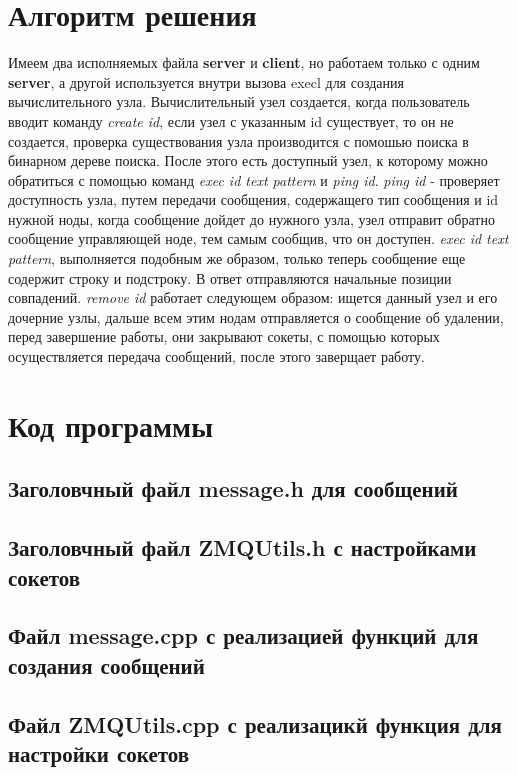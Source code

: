 \section*{Алгоритм решения}
Имеем два исполняемых файла \textbf{server} и \textbf{client}, но работаем только с одним \textbf{server}, а другой используется внутри вызова execl для создания вычислительного узла. Вычислительный узел создается, когда пользователь вводит команду \textit{create id}, если узел с указанным id существует, то он не создается, проверка существования узла производится с помошью поиска в бинарном дереве поиска. После этого есть доступный узел, к которому можно обратиться с помощью команд \textit{exec id text pattern} и \textit{ping id}. \textit{ping id} - проверяет доступность узла, путем передачи сообщения, содержащего тип сообщения и id нужной ноды,  когда сообщение дойдет до нужного узла, узел отправит обратно сообщение управляющей ноде, тем самым сообщив, что он доступен. \textit{exec id text pattern}, выполняется подобным же образом, только теперь сообщение еще содержит строку и подстроку. В ответ отправляются начальные позиции совпадений. \textit{remove id} работает следующем образом: ищется данный узел и его дочерние узлы, дальше всем этим нодам отправляется о сообщение об удалении, перед завершение работы, они закрывают сокеты, с помощью которых осуществляется передача сообщений, после этого заверщает работу.      
\pagebreak
\section*{Код программы}
\subsection*{Заголовчный файл message.h для сообщений}

\subsection*{Заголовчный файл ZMQUtils.h с настройками сокетов}

\subsection*{Файл message.cpp с реализацией функций для создания сообщений}

\subsection*{Файл ZMQUtils.cpp с реализацикй функция для настройки сокетов}

